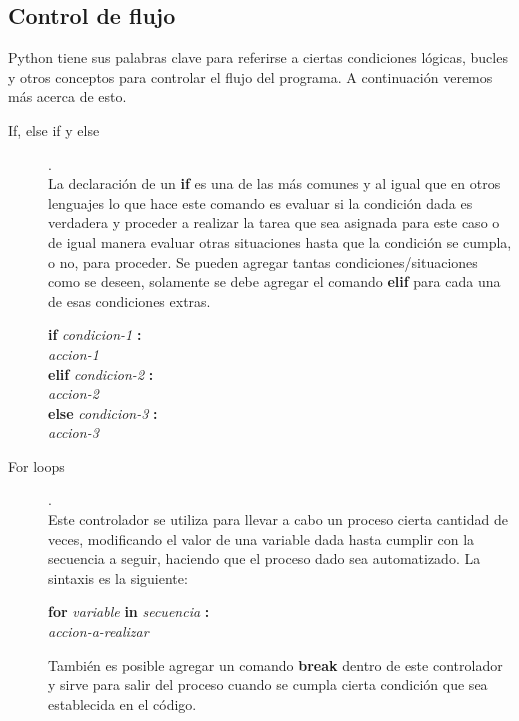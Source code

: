 \documentclass[a4paper]{article}
\begin{document}
\subsection{Control de flujo}
Python tiene sus palabras clave para referirse a ciertas condiciones lógicas, bucles y otros conceptos para controlar el flujo del programa. A continuación veremos más acerca de esto.

\begin{description}
\item[If, else if y else]. \\
La declaración de un \textbf{if} es una de las más comunes y al igual que en otros lenguajes lo que hace este comando es evaluar si la condición dada es verdadera y proceder a realizar la tarea que sea asignada para este caso o de igual manera evaluar otras situaciones hasta que la condición se cumpla, o no, para proceder. Se pueden agregar tantas condiciones/situaciones como se deseen, solamente se debe agregar el comando \textbf{elif} para cada una de esas condiciones extras.

\begin{center}
	\textbf{if} \textit{condicion-1} \textbf{:} \\
	\hspace{1em} \textit{accion-1} \\
	\textbf{elif} \textit{condicion-2} \textbf{:} \\
	\hspace{1em} \textit{accion-2} \\
	\textbf{else} \textit{condicion-3} \textbf{:} \\
	\hspace{1em} \textit{accion-3}
\end{center}

\item[For loops]. \\
Este controlador se utiliza para llevar a cabo un proceso cierta cantidad de veces, modificando el valor de una variable dada hasta cumplir con la secuencia a seguir, haciendo que el proceso dado sea automatizado. La sintaxis es la siguiente:

\begin{center}
	\textbf{for} \textit{variable} \textbf{in} \textit{secuencia} \textbf{:} \\
	\textit{accion-a-realizar}
\end{center}

También es posible agregar un comando \textbf{break} dentro de este controlador y sirve para salir del proceso cuando se cumpla cierta condición que sea establecida en el código.


\end{description}
\end{document}
